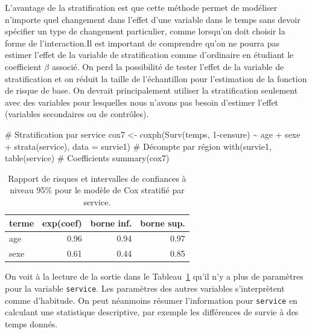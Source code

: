 \documentclass[
  11pt,
  letterpaper,
]{scrbook}
\newenvironment{Shaded}{\begin{snugshade}}{\end{snugshade}}
\newcommand{\AttributeTok}[1]{\textcolor[rgb]{0.40,0.45,0.13}{#1}}
\newcommand{\CommentTok}[1]{\textcolor[rgb]{0.37,0.37,0.37}{#1}}
\newcommand{\DecValTok}[1]{\textcolor[rgb]{0.68,0.00,0.00}{#1}}
\newcommand{\FunctionTok}[1]{\textcolor[rgb]{0.28,0.35,0.67}{#1}}
\newcommand{\NormalTok}[1]{\textcolor[rgb]{0.00,0.23,0.31}{#1}}
\newcommand{\OtherTok}[1]{\textcolor[rgb]{0.00,0.23,0.31}{#1}}
\newcommand{\SpecialCharTok}[1]{\textcolor[rgb]{0.37,0.37,0.37}{#1}}
\theoremstyle{definition}
\theoremstyle{remark}
\begin{document}
L'avantage de la stratification est que cette méthode permet de
modéliser n'importe quel changement dans l'effet d'une variable dans le
temps sans devoir spécifier un type de changement particulier, comme
lorsqu'on doit choisir la forme de l'interaction.Il est important de
comprendre qu'on ne pourra pas estimer l'effet de la variable de
stratification comme d'ordinaire en étudiant le coefficient \(\beta\)
associé. On perd la possibilité de tester l'effet de la variable de
stratification et on réduit la taille de l'échantillon pour l'estimation
de la fonction de risque de base. On devrait principalement utiliser la
stratification seulement avec des variables pour lesquelles nous n'avons
pas besoin d'estimer l'effet (variables secondaires ou de contrôles).

\begin{Shaded}
\begin{Highlighting}[]
\CommentTok{\# Stratification par service}
\NormalTok{cox7 }\OtherTok{\textless{}{-}} \FunctionTok{coxph}\NormalTok{(}\FunctionTok{Surv}\NormalTok{(temps, }\DecValTok{1}\SpecialCharTok{{-}}\NormalTok{censure) }\SpecialCharTok{\textasciitilde{}} 
\NormalTok{                age }\SpecialCharTok{+}\NormalTok{ sexe }\SpecialCharTok{+} \FunctionTok{strata}\NormalTok{(service), }
              \AttributeTok{data =}\NormalTok{ survie1)}
\CommentTok{\# Décompte par région}
\FunctionTok{with}\NormalTok{(survie1, }\FunctionTok{table}\NormalTok{(service)}
\CommentTok{\# Coefficients}
\FunctionTok{summary}\NormalTok{(cox7)}
\end{Highlighting}
\end{Shaded}

\hypertarget{tbl-cox-stratif}{}
\begin{table}
\caption{\label{tbl-cox-stratif}Rapport de risques et intervalles de confiances à niveau 95\% pour le
modèle de Cox stratifié par service. }\tabularnewline

\centering
\begin{tabular}{lrrr}
\toprule
terme & exp(coef) & borne inf. & borne sup.\\
\midrule
age & 0.96 & 0.94 & 0.97\\
sexe & 0.61 & 0.44 & 0.85\\
\bottomrule
\end{tabular}
\end{table}

On voit à la lecture de la sortie dans le Tableau~\ref{tbl-cox-stratif}
qu'il n'y a plus de paramètres pour la variable \texttt{service}. Les
paramètres des autres variables s'interprètent comme d'habitude. On peut
néanmoins résumer l'information pour \texttt{service} en calculant une
statistique descriptive, par exemple les différences de survie à des
temps donnés.
\end{document}
